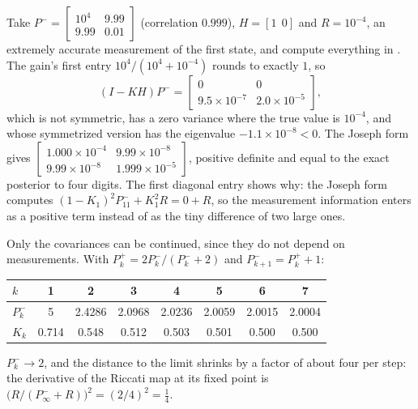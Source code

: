 \begin{solutions}
  \item Take $P^- = \begin{bmatrix}10^4 & 9.99\\ 9.99 & 0.01\end{bmatrix}$ (correlation $0.999$), $H = [1\ \ 0]$ and $R = 10^{-4}$, an extremely accurate measurement of the
        first state, and compute everything in . The gain's first entry $10^4/(10^4 + 10^{-4})$ rounds to exactly $1$, so
        \[
          (I - KH)P^- = \begin{bmatrix}0 & 0\\ 9.5\times10^{-7} & 2.0\times10^{-5}\end{bmatrix},
        \]
        which is not symmetric, has a zero variance where the true value is $10^{-4}$, and whose symmetrized version has the eigenvalue
        $-1.1\times10^{-8} < 0$. The Joseph form gives $\begin{bmatrix}1.000\times10^{-4} & 9.99\times10^{-8}\\ 9.99\times10^{-8} & 1.999\times10^{-5}\end{bmatrix}$, positive definite and
        equal to the exact posterior to four digits. The first diagonal entry shows why: the Joseph form computes $(1 - K_1)^2P^-_{11} + K_1^2R = 0 + R$, so
        the measurement information enters as a positive term instead of as the tiny difference of two large ones.

  \item Only the covariances can be continued, since they do not depend on measurements. With $P_k^+ = 2P_k^-/(P_k^- + 2)$ and $P_{k+1}^- = P_k^+ + 1$:
        \begin{center}\small
        \begin{tabular}{@{}l c c c c c c c@{}}
        \toprule
        $k$ & 1 & 2 & 3 & 4 & 5 & 6 & 7 \\
        \midrule
        $P_k^-$ & 5 & 2.4286 & 2.0968 & 2.0236 & 2.0059 & 2.0015 & 2.0004 \\
        $K_k$ & 0.714 & 0.548 & 0.512 & 0.503 & 0.501 & 0.500 & 0.500 \\
        \bottomrule
        \end{tabular}
        \end{center}
        $P_k^- \to 2$, and the distance to the limit shrinks by a factor of about four per step: the derivative of the Riccati map at its fixed point is
        $\big(R/(P^-_\infty + R)\big)^2 = (2/4)^2 = \tfrac14$.


\end{solutions}
